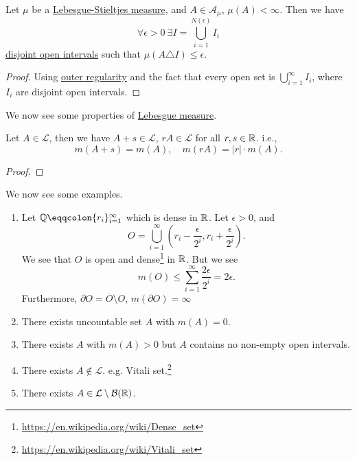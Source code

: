 \begin{proposition}
	Let \(\mu \) be a \hyperref[def:Lebesgue-Stieltjes-measure]{Lebesgue-Stieltjes measure}, and \(A\in \mathcal{A} _\mu \), \(\mu (A)<\infty \). Then we have
	\[
		\forall \epsilon >0\ \exists I = \bigcup\limits_{i=1}^{N(\epsilon )} I_{i}
	\]
	\underline{disjoint open intervals} such that \(\mu (A\triangle  I)\leq \epsilon \).
\end{proposition}
\begin{proof}
	Using \hyperref[thm:outer-regularity]{outer regularity} and the fact that every open set is \(\bigcup\limits_{i=1}^{\infty} I_{i}\), where \(I_{i}\) are disjoint open intervals.
\end{proof}

We now see some properties of \hyperref[def:Lebesgue-measure]{Lebesgue measure}.

\begin{theorem}
	Let \(A\in \mathcal{L}\), then we have \(A + s\in \mathcal{L}\), \(rA\in\mathcal{L}  \) for all \(r, s\in\mathbb{\MakeUppercase{r}} \). i.e.,
	\[
		m(A+s) = m(A),\quad m(rA) = \left\vert r \right\vert \cdot m(A).
	\]
\end{theorem}
\begin{proof}
\end{proof}

\begin{eg}
	We now see some examples.
	\begin{enumerate}
		\item Let \(\mathbb{\MakeUppercase{q}}\eqqcolon\{r_{i}\}_{i=1}^{\infty}\) which is dense in \(\mathbb{\MakeUppercase{r}} \). Let \(\epsilon >0\), and
		      \[
			      O = \bigcup\limits_{i=1}^{\infty} \left(r_{i} - \frac{\epsilon}{2^i}, r_{i} + \frac{\epsilon}{2^i}\right).
		      \]
		      We see that \(O\) is open and dense\footnote{\url{https://en.wikipedia.org/wiki/Dense_set}} in \(\mathbb{\MakeUppercase{r}} \). But we see
		      \[
			      m(O) \leq \sum\limits_{i=1}^{\infty} \frac{2\epsilon }{2^i} = 2\epsilon.
		      \]
		      Furthermore, \(\partial O = \overline{O} \setminus O\), \(m(\partial O) = \infty \)
		\item There exists uncountable set \(A\) with \(m(A)=0\).
		\item There exists \(A\) with \(m(A)>0\) but \(A\) contains no non-empty open intervals.
		\item There exists \(A\notin \mathcal{L} \). e.g. Vitali set.\footnote{\url{https://en.wikipedia.org/wiki/Vitali_set}}
		\item There exists \(A\in\mathcal{L} \setminus \mathcal{B} (\mathbb{\MakeUppercase{r}} )\).
	\end{enumerate}
\end{eg}